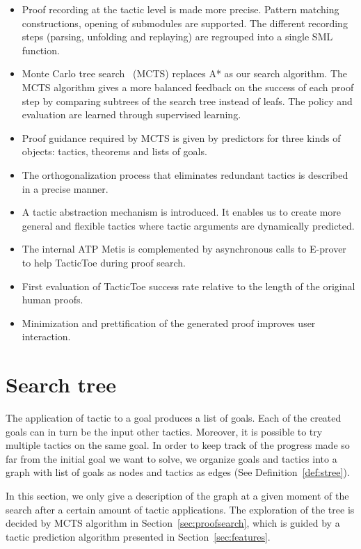 \documentclass[runningheads,a4paper,draft]{svjour3}
\def\eprover{\textsf{E-prover}\xspace}
\def\sml{\textsf{SML}\xspace}
\def\metis{\textsf{Metis}\xspace}
\def\tactictoe{\textsf{TacticToe}\xspace}
\begin{document}
\begin{itemize}
\item Proof recording at the tactic level is made more precise. Pattern
matching constructions, opening of submodules are supported. The different
recording steps (parsing, unfolding and replaying) are regrouped into a single
\sml function.
\item Monte Carlo tree search~\cite{montecarlo} (MCTS) replaces A* as our
search algorithm. The MCTS algorithm gives a more balanced feedback on
the success of
each proof step by
comparing subtrees of the search tree instead of leafs. The policy and
evaluation are learned
through supervised learning.
\item Proof guidance required by MCTS is given by predictors for
three kinds of objects: tactics, theorems and lists of goals.
\item The orthogonalization process that eliminates redundant tactics is 
described in a precise manner.
\item A tactic abstraction mechanism is introduced. It enables us to create
more general and flexible tactics where tactic arguments are dynamically
predicted.
\item The internal ATP \metis is complemented
by asynchronous calls to \eprover to help \tactictoe during proof search.
\item First evaluation of \tactictoe success rate relative to
the length of the original human proofs.
\item Minimization and prettification of the generated proof improves user 
interaction.
\end{itemize}


\section{Search tree}\label{sec:prelim}

The application of tactic to a goal produces a list of goals. Each of the 
created goals can in turn be the input other tactics. Moreover, it is possible 
to try multiple tactics on the same goal. In order to keep track of the 
progress made so far from the initial goal we want to solve, we organize
goals and tactics into a graph with list of goals as nodes and tactics as edges
(See Definition~\ref{def:stree}).

In this section, we only give a description of the graph at a given 
moment of the search after a certain amount of tactic applications. 
The exploration of the tree is decided by MCTS algorithm in 
Section~\ref{sec:proofsearch}, which is guided by a tactic prediction algorithm 
presented in Section~\ref{sec:features}.
\end{document}

